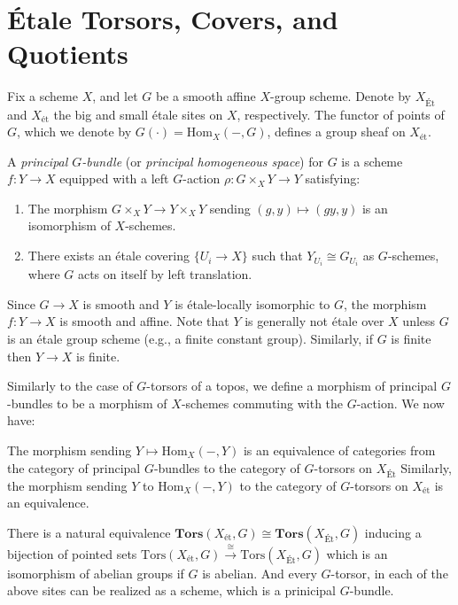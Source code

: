 \section{\'Etale Torsors, Covers, and Quotients}
Fix a scheme $X$, and let $G$ be a smooth affine $X$-group scheme. 
Denote by $X_{\text{Ét}}$ and $X_{\text{ét}}$ the big and small étale sites on $X$, respectively. 
The functor of points of $G$, which we denote by $G(\cdot) = \mathrm{Hom}_X(-, G)$, defines a group sheaf on 
$X_{\text{ét}}$.

\begin{definition} A \textit{principal $G$-bundle} (or \textit{principal homogeneous space}) for $G$ is a 
scheme $f : Y \to X$ equipped with a left $G$-action $\rho: G \times_X Y \to Y$ satisfying:
\begin{enumerate}
    \item The morphism $G \times_X Y \to Y \times_X Y$ sending $(g, y) \mapsto (gy, y)$ is an isomorphism of $X$-schemes.
    \item There exists an étale covering $\{U_i \to X\}$ such that $Y_{U_i} \cong G_{U_i}$ as $G$-schemes, 
    where $G$ acts on itself by left translation.
\end{enumerate}
\end{definition}

\begin{rem*}
    Since $G \to X$ is smooth and $Y$ is étale-locally isomorphic to $G$, 
    the morphism $f: Y \to X$ is smooth and affine. Note that $Y$ is generally not étale over $X$ unless $G$ is an 
    étale group scheme (e.g., a finite constant group).
    Similarly, if $G$ is finite then $Y \to X$ is finite.
\end{rem*}

Similarly to the case of $G$-torsors of a topos, we define a morphism of principal $G$-bundles to be a morphism of $X$-schemes commuting with the
$G$-action. We now have:

\begin{theorem}\label{theorem:torsors_are_realized_as_spaces}
    The morphism sending $Y \mapsto \mathrm{Hom}_X(-, Y)$ is an equivalence of categories from the category of principal $G$-bundles 
    to the category of $G$-torsors on $X_{\text{\'Et}}$
    Similarly, the morphism sending $Y$ to $\mathrm{Hom}_X(-, Y)$ to the category of $G$-torsors on $X_{\text{ét}}$ is an equivalence.
\end{theorem}

\begin{cor}
    There is a natural equivalence $\mathbf{Tors}(X_{\mathrm{\text{\'et}}}, G) \cong \mathbf{Tors}(X_{\text{\'Et}}, G)$ 
    inducing a bijection of pointed sets $\mathrm{Tors}(X_{\text{\'et}}, G) \xrightarrow{\cong} \mathrm{Tors}(X_{\text{\'Et}}, G)$ 
    which is an isomorphism of abelian groups if $G$ is abelian.
    And every $G$-torsor, in each of the above sites can be realized as a scheme, which is a prinicipal $G$-bundle.
\end{cor}

